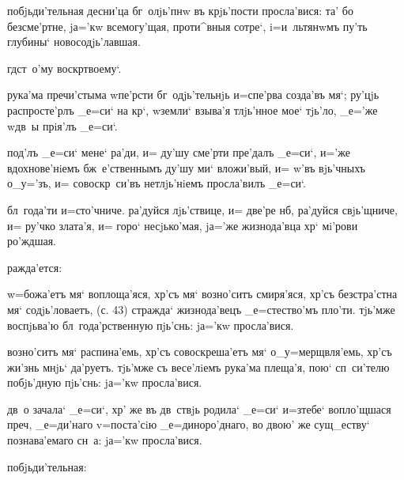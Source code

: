

  побjьди'тельная десни'ца бг~олjь'пнw 
въ крjь'пости просла'вися: та' бо безсме'ртне, jа='кw 
всемогу'щая, проти^вныя сотре`, i=и~льтянwмъ пу'ть 
глубины` новосодjь'лавшая.

  гд ст~о'му воскр твоему`.

  рука'ма пречи'стыма w\т пе'рсти 
бг~одjь'тельнjь и=спе'рва созда'въ мя`; ру'цjь 
распросте'рлъ _е=си` на кр`, w\т земли` взыва'я 
тлjь'нное мое` тjь'ло, _е='же w\т дв~ы прiя'лъ _е=си`.

 под'лъ _е=си` мене` ра'ди, и= 
ду'шу сме'рти пре'далъ _е=си`, и='же вдохнове'нiемъ 
бж~е'ственнымъ ду'шу ми` вложи'вый, и= w'въ 
вjь'чныхъ о_у='зъ, и= совоскр~си'въ нетлjь'нiемъ 
просла'вилъ _е=си`.

  бл~года'ти и=сто'чниче. 
ра'дуйся лjь'ствице, и= две'ре нб, ра'дуйся 
свjь'щниче, и= ру'чко злата'я, и= горо` несjько'мая, 
jа='же жизнода'вца хр` мi'рови ро'ждшая.


      
ражда'ется:

 w=божа'етъ мя` воплоща'яся, хр'съ мя` 
возно'ситъ смиря'яся, хр'съ безстра'стна мя` 
содjь'ловаетъ, (с. 43) стражда` жизнода'вецъ 
_е=стество'мъ пло'ти. тjь'мже воспjьва'ю 
бл~года'рственную пjь'снь: jа='кw просла'вися.

 возно'ситъ мя` распина'емь, хр'съ 
совоскреша'етъ мя` о_у=мерщвля'емь, хр'съ жи'знь 
мнjь` да'руетъ. тjь'мже съ весе'лiемъ рука'ма плеща'я, 
пою` сп~си'телю побjь'дную пjь'снь: jа='кw просла'вися.

  дв~о зачала` _е=си`, хр' же 
въ дв~ствjь родила` _е=си` и=з\ъ тебе` вопло'щшася 
преч, _е=ди'наго v=поста'сiю _е=диноро'днаго, во 
двою' же сущ_еству` познава'емаго сн~а: jа='кw 
просла'вися.


      
побjьди'тельная:

